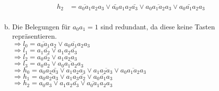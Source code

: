 \documentclass[11pt,a4paper]{article}
\begin{document}
\begin{enumerate}[a)]
\begin{align*}
          h_2&=\overline{a_0a_1}a_2a_3\vee\bar{a_0}a_1a_2\bar{a_3}\vee a_0\overline{a_1a_2}a_3\vee a_0\bar{a_1}a_2a_3\\
        \end{align*}
        \newpage
      \item Die Belegungen für  $a_0a_1=1$ sind redundant, da diese keine Tasten repräsentieren.\\
        \kvnoindex
         $\Rightarrow l_0=\overline{a_0a_1}a_2\vee\overline{a_0a_1a_2}a_3$\\
         $\Rightarrow l_1=a_1\bar{a_2}\vee a_1a_2\bar{a_3}$\\
         $\Rightarrow l_2=a_0\bar{a_2}\vee a_1a_2a_3$\\
         $\Rightarrow l_3=a_0a_2\vee\overline{a_0a_1a_2a_3}$\\
         $\Rightarrow h_0=a_0a_2\bar{a_3}\vee a_1a_2a_3 \vee a_1\overline{a_2a_3}\vee\overline{a_0a_1a_2a_3}$\\
         $\Rightarrow h_1=a_0\overline{a_2a_3}\vee a_1a_3\bar{a_2}\vee \overline{a_0a_1a_3}$\\
         $\Rightarrow h_2=a_0a_3\vee a_1a_2\bar{a_3}\vee \overline{a_0a_1}a_2a_3$
    \end{enumerate}
\end{document}
